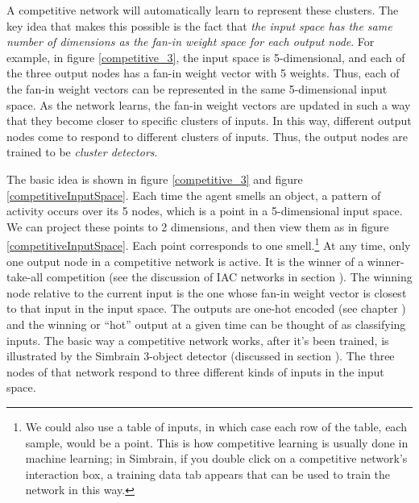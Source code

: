 A competitive network will automatically learn to represent these clusters. The key idea that makes this possible is the fact that {\it the input space has the same number of dimensions as the fan-in weight space for each output node}. For example, in figure \ref{competitive_3}, the input space is 5-dimensional, and each of the three output nodes has a fan-in weight vector with 5 weights. Thus, each of the fan-in weight vectors can be represented in the same 5-dimensional input space. As the network learns, the fan-in weight vectors are updated in such a way that they become closer to specific clusters of inputs. In this way, different output nodes come to respond to different clusters of inputs. Thus, the output nodes are trained to be \emph{cluster detectors}.

The basic idea is shown in figure \ref{competitive_3} and figure \ref{competitiveInputSpace}. Each time the agent smells an object, a pattern of activity occurs over its 5 nodes, which is a point in a 5-dimensional input space. We can project these points to 2 dimensions, and then view them as in figure \ref{competitiveInputSpace}. Each point corresponds to one smell.\footnote{We could also use a table of inputs, in which case each row of the table, each sample, would be a point. This is how competitive learning is usually done in machine learning; in Simbrain, if you double click on a competitive network's interaction box, a training data tab appears that can be used to train the network in this way.} At any time, only one output node in a competitive network is active. It is the winner of a winner-take-all competition (see the discussion of IAC networks in section ). The winning node relative to the current input is the one whose fan-in weight vector is closest to that input in the input space. The outputs are one-hot encoded (see chapter ) and the winning or ``hot'' output at a given time can be thought of as classifying inputs. The basic way a competitive network works, after it's been trained, is illustrated by the Simbrain 3-object detector (discussed in section ). The three nodes of that network respond to three different kinds of inputs in the input space.

